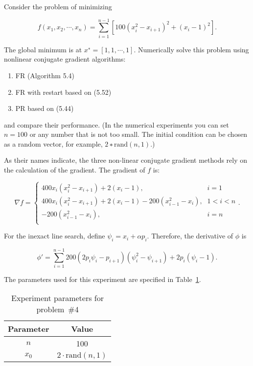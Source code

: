 \begin{problem}
  Consider the problem of minimizing

  \[f(x_{1},x_{2},\cdots,x_{n}) = \sum_{i=1}^{n-1}[100(x^{2}_{i} - x_{i+1})^{2} +(x_{i} - 1)^{2}]\textrm{.}\]

  The global minimum is at $x^{∗} = [1, 1,\cdots,1]$. Numerically solve this problem using nonlinear conjugate gradient algorithms:
  \begin{enumerate}
    \item FR (Algorithm 5.4)
    \item FR with restart based on (5.52)
    \item PR based on (5.44)
  \end{enumerate}

  \noindent
  and compare their performance. (In the numerical experiments you can set ${n = 100}$ or any number that is not too small. The initial condition can be chosen as a random vector, for example, $2∗\text{rand}(n,1)$.)
\end{problem}

As their names indicate, the three non-linear conjugate gradient methods rely on the calculation of the gradient.  The gradient of $f$ is:

\[ \nabla f = \left\{
                \begin{array}{lc}
                  400x_i(x_{i}^{2} - x_{i+1}) + 2(x_i - 1)\text{,} & i = 1 \\
                  400x_i(x_{i}^{2} - x_{i+1}) + 2(x_i - 1) -200(x^{2}_{i-1} - x_{i})\text{,} & 1 < i < n \\
                  -200(x^{2}_{i-1} - x_{i})\text{,} & i = n \\
                \end{array}
              \right. \text{.} \]
              
\noindent
For the inexact line search, define $\psi_i = x_i + \alpha p_i$.  Therefore, the derivative of $\phi$ is

\[ \phi' =  \sum_{i=1}^{n-1} 200 (2p_i \psi_i - p_{i+1}) (\psi_{i}^{2} - \psi_{i+1}) 
            + 2p_i(\psi_i - 1) \text{.} \]

\noindent
The parameters used for this experiment are specified in Table~\ref{tab:p04:ExperimentParams}.

\begin{table}[h]
  \centering
  \caption{Experiment parameters for problem~\#4}\label{tab:p04:ExperimentParams}
  \begin{tabular}{|c|c|}
    \hline
    \textbf{Parameter} & \textbf{Value} \\
    \hline\hline
    $n$     & 100 \\\hline
    $x_{0}$ & $2\cdot\text{rand}(n,1)$\\\hline
  \end{tabular}
\end{table}

